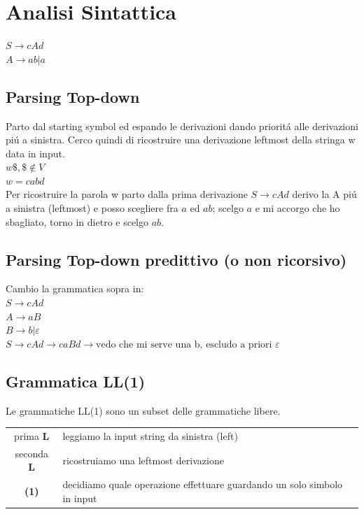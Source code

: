 \chapter{Analisi Sintattica}
$S \rightarrow cAd$\\
$A \rightarrow ab | a$\\

\section{Parsing Top-down}
Parto dal starting symbol ed espando le derivazioni dando priorit\'a alle derivazioni pi\'u a sinistra.
Cerco quindi di ricostruire una derivazione leftmost della stringa w data in input.\\[5pt]
$w\$, \$ \not\in V$\\
$w=cabd$\\[5pt]
Per ricostruire la parola w parto dalla prima derivazione $S \rightarrow cAd$ derivo la A pi\'u a sinistra (leftmost) e posso scegliere 
fra $a$ ed $ab$; scelgo $a$ e mi accorgo che ho sbagliato, torno in dietro e scelgo $ab$.

\section{Parsing Top-down predittivo (o non ricorsivo)}
Cambio la grammatica sopra in: \\
$S \rightarrow cAd$\\
$A \rightarrow aB$\\
$B \rightarrow b | \varepsilon $\\[5pt]
$S \rightarrow cAd \rightarrow caBd \rightarrow \text{vedo che mi serve una b, escludo a priori } \varepsilon$\\ 

\section{Grammatica LL(1)}
Le grammatiche LL(1) sono un subset delle grammatiche libere.\\
\begin{tabular}{cl}
    prima \textbf{L}    & leggiamo la input string da sinistra (left)\\
    seconda \textbf{L}  & ricostruiamo una leftmost derivazione\\
    \textbf{(1)}        & decidiamo quale operazione effettuare guardando un solo simbolo in input\\
\end{tabular}


